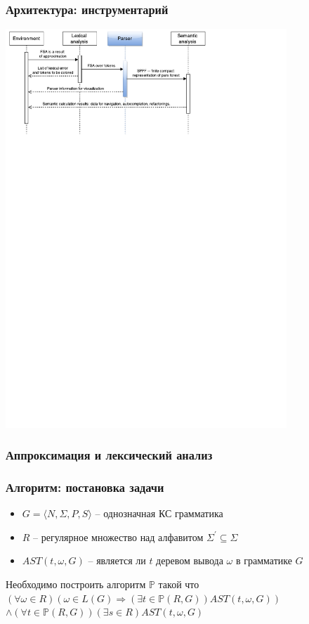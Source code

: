 \documentclass{beamer}
\begin{document}
\begin{frame}
    \transwipe[direction=90]
    \frametitle{Архитектура: инструментарий}
    \begin{center}
        \includegraphics[width=300pt]{pictures/Seq.pdf}
    \end{center}
\end{frame}

\begin{frame}
    \transwipe[direction=90]
    \frametitle{Аппроксимация и лексический анализ}    
\end{frame}

\begin{frame}
    \transwipe[direction=90]
    \frametitle{Алгоритм: постановка задачи}
    \begin{itemize}    
        \item $G=\langle N,\Sigma, P,S\rangle$ -- однозначная КС грамматика
        \item $R$ -- регулярное множество над алфавитом ${\Sigma}^{'} \subseteq \Sigma $
        \item $AST(t,\omega,G)$ -- является ли $t$ деревом вывода $\omega$ в грамматике $G$
    \end{itemize}
    Необходимо построить алгоритм $\mathbb{P}$ такой что
    $(\forall \omega \in R) (\omega \in L(G) \Rightarrow (\exists t \in \mathbb{P}(R,G))AST(t, \omega, G))$
    $\land (\forall t \in \mathbb{P}(R,G))(\exists s \in R)AST(t,\omega,G)$
\end{frame}
\end{document}

